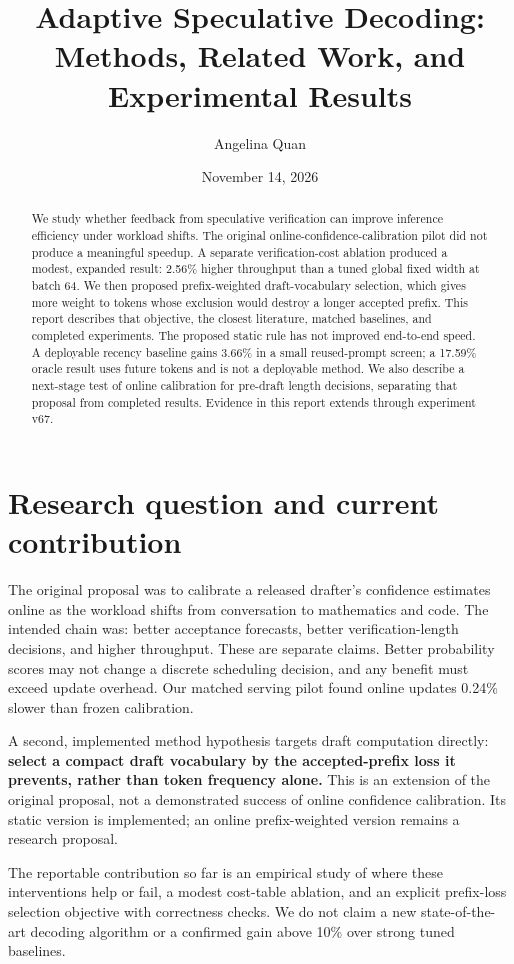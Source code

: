 \documentclass[10pt]{article}
\title{Adaptive Speculative Decoding:\\Methods, Related Work, and Experimental Results}
\author{Angelina Quan}\date{November 14, 2026}
\begin{document}
\maketitle
\begin{abstract}
We study whether feedback from speculative verification can improve inference efficiency under workload shifts. The original online-confidence-calibration pilot did not produce a meaningful speedup. A separate verification-cost ablation produced a modest, expanded result: 2.56\% higher throughput than a tuned global fixed width at batch 64. We then proposed prefix-weighted draft-vocabulary selection, which gives more weight to tokens whose exclusion would destroy a longer accepted prefix. This report describes that objective, the closest literature, matched baselines, and completed experiments. The proposed static rule has not improved end-to-end speed. A deployable recency baseline gains 3.66\% in a small reused-prompt screen; a 17.59\% oracle result uses future tokens and is not a deployable method. We also describe a next-stage test of online calibration for pre-draft length decisions, separating that proposal from completed results. Evidence in this report extends through experiment v67.
\end{abstract}
\section{Research question and current contribution}
The original proposal was to calibrate a released drafter's confidence estimates online as the workload shifts from conversation to mathematics and code. The intended chain was: better acceptance forecasts, better verification-length decisions, and higher throughput. These are separate claims. Better probability scores may not change a discrete scheduling decision, and any benefit must exceed update overhead. Our matched serving pilot found online updates 0.24\% slower than frozen calibration.

A second, implemented method hypothesis targets draft computation directly: \textbf{select a compact draft vocabulary by the accepted-prefix loss it prevents, rather than token frequency alone.} This is an extension of the original proposal, not a demonstrated success of online confidence calibration. Its static version is implemented; an online prefix-weighted version remains a research proposal.

The reportable contribution so far is an empirical study of where these interventions help or fail, a modest cost-table ablation, and an explicit prefix-loss selection objective with correctness checks. We do not claim a new state-of-the-art decoding algorithm or a confirmed gain above 10\% over strong tuned baselines.
\end{document}
